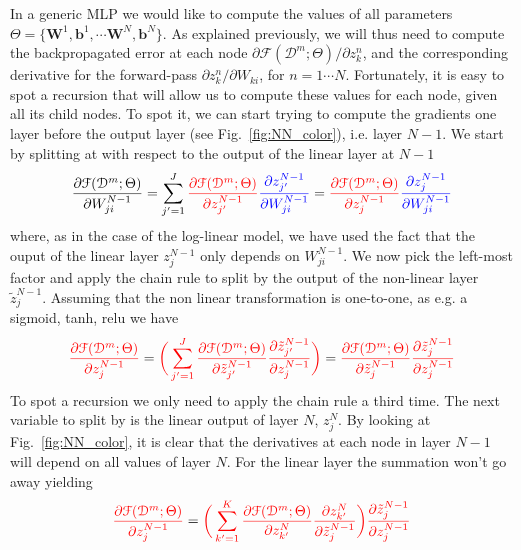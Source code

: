 In a generic MLP we would like to compute the values of all parameters $\Theta=\{\mathbf{W}^1, \mathbf{b}^1, \cdots \mathbf{W}^N, \mathbf{b}^N\}$. As explained previously, we will thus need to compute the backpropagated error at each node $\partial \mathcal{F}(\mathcal{D}^m;\Theta)/\partial z_k^n$, and the corresponding derivative for the forward-pass $\partial z_k^n/\partial W_{ki}$, for $n = 1 \cdots N$. Fortunately, it is easy to spot a recursion that will allow us to compute these values for each node, given all its child nodes. To spot it, we can start trying to compute the gradients one layer before the output layer (see Fig.~\ref{fig:NN_color}), i.e. layer $N-1$. We start by splitting at with respect to the output of the linear layer at $N-1$
%
\begin{align}
        \frac{\partial \mathcal{F}(\mathcal{D}^m;\Theta)}{\partial W_{ji}^{N-1}} = \sum_{j'=1}^{J} {\color{red} \frac{\partial \mathcal{F}(\mathcal{D}^m;\Theta)}{\partial z_{j'}^{N-1}}} {\color{blue} \frac{\partial z_{j'}^{N-1}}{\partial W_{ji}^{N-1}}} = {\color{red} \frac{\partial \mathcal{F}(\mathcal{D}^m;\Theta)}{\partial z_{j}^{N-1}}} {\color{blue} \frac{\partial z_{j}^{N-1}}{\partial W_{ji}^{N-1}}}
\label{eq:BPderivation1}
\end{align}
%
where, as in the case of the log-linear model, we have used the fact that the ouput of the linear layer $z_j^{N-1}$ only depends on $W_{ji}^{N-1}$. We now pick the left-most factor and apply the chain rule to split by the output of the non-linear layer $\tilde{z}_j^{N-1}$. Assuming that the non linear transformation is one-to-one, as e.g. a sigmoid, tanh, relu we have
%
\begin{align}
        {\color{red} \frac{\partial \mathcal{F}(\mathcal{D}^m;\Theta)}{\partial z_{j}^{N-1}}} = {\color{red} \bigg(\sum_{j'=1}^{J} \frac{\partial \mathcal{F}(\mathcal{D}^m;\Theta)}{\partial \tilde{z}_{j'}^{N-1}} \frac{\partial \tilde{z}_{j'}^{N-1}}{\partial z_{j}^{N-1}}\bigg)} = {\color{red} \frac{\partial \mathcal{F}(\mathcal{D}^m;\Theta)}{\partial \tilde{z}_{j}^{N-1}} \frac{\partial \tilde{z}_{j}^{N-1}}{\partial z_{j}^{N-1}}}
\label{eq:BPderivation2}
\end{align}
%
To spot a recursion we only need to apply the chain rule a third time. The next variable to split by is the linear output of layer $N$, $z_j^{N}$. By looking at Fig.~\ref{fig:NN_color}, it is clear that the derivatives at each node in layer $N-1$ will depend on all values of layer $N$. For the linear layer the summation won't go away yielding
%
\begin{align}
        {\color{red} \frac{\partial \mathcal{F}(\mathcal{D}^m;\Theta)}{\partial z_{j}^{N-1}}} = {\color{red} \bigg(\sum_{k'=1}^{K} \frac{\partial \mathcal{F}(\mathcal{D}^m;\Theta)}{\partial z_{k'}^{N}} \frac{\partial z_{k'}^{N}}{\partial \tilde{z}_{j}^{N-1}}\bigg)\frac{\partial \tilde{z}_{j}^{N-1}}{\partial z_{j}^{N-1}}}
\label{eq:BPderivation3}
\end{align}
